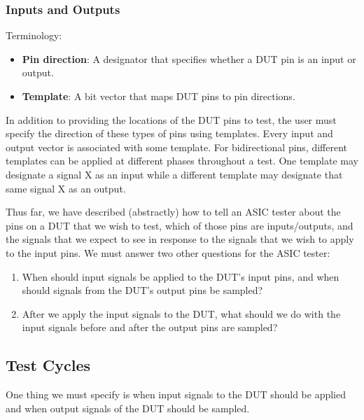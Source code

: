 \subsubsection{Inputs and Outputs}
\begin{flushleft}
Terminology: 
\begin{itemize}
\item \textbf{Pin direction}: A designator that specifies whether a DUT pin is an input or output.
\item \textbf{Template}: A bit vector that maps DUT pins to pin directions.
\end{itemize}
\end{flushleft}

In addition to providing the locations of the DUT pins to test, the user must specify the direction of these types of pins using templates. Every input and output vector is associated with some template. For bidirectional pins, different templates can be applied at different phases throughout a test. One template may designate a signal X as an input while a different template may designate that same signal X as an output. 

Thus far, we have described (abstractly) how to tell an ASIC tester about the pins on a DUT that we wish to test, which of those pins are inputs/outputs, and the signals that we expect to see in response to the signals that we wish to apply to the input pins. We must answer two other questions for the ASIC tester: 

\begin{enumerate}
\item When should input signals be applied to the DUT's input pins, and when should signals from the DUT's output pins be sampled?
\item After we apply the input signals to the DUT, what should we do with the input signals before and after the output pins are sampled?
\end{enumerate}

\subsection{Test Cycles}
One thing we must specify is when input signals to the DUT should be applied and when output signals of the DUT should be sampled.

